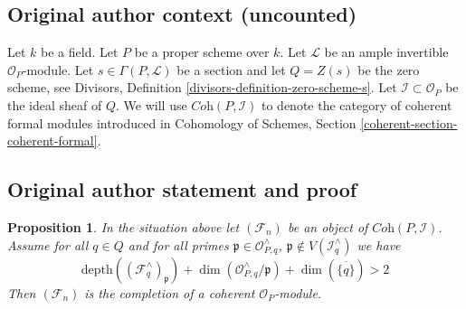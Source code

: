 \documentclass[10pt,a4paper]{amsart}
\theoremstyle{plain}
\newtheorem{proposition}[subsection]{Proposition}
\theoremstyle{definition}
\theoremstyle{remark}
\numberwithin{equation}{subsection}
\begin{document}
\subsection*{Original author context (uncounted)}
\noindent
Let $k$ be a field. Let $P$ be a proper scheme over $k$.
Let $\mathcal{L}$ be an ample invertible $\mathcal{O}_P$-module.
Let $s \in \Gamma(P, \mathcal{L})$ be a section and let
$Q = Z(s)$ be the zero scheme, see
Divisors, Definition \ref{divisors-definition-zero-scheme-s}.
Let $\mathcal{I} \subset \mathcal{O}_P$ be the ideal sheaf of $Q$.
We will use $\textit{Coh}(P, \mathcal{I})$ to denote the category
of coherent formal modules introduced in
Cohomology of Schemes, Section \ref{coherent-section-coherent-formal}.

\subsection*{Original author statement and proof}
\begin{proposition}
\label{proposition-lefschetz-existence}
In the situation above let $(\mathcal{F}_n)$ be an object of
$\textit{Coh}(P, \mathcal{I})$. Assume for all $q \in Q$ and for
all primes $\mathfrak p \in \mathcal{O}_{P, q}^\wedge$,
$\mathfrak p \not \in V(\mathcal{I}_q^\wedge)$ we have
$$
\text{depth}((\mathcal{F}_q^\wedge)_\mathfrak p) +
\dim(\mathcal{O}_{P, q}^\wedge/\mathfrak p) +
\dim(\overline{\{q\}}) > 2
$$
Then $(\mathcal{F}_n)$ is the completion of a coherent
$\mathcal{O}_P$-module.
\end{proposition}
\end{document}
